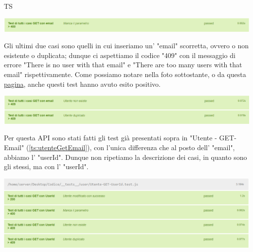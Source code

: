 \begin{listaPersonale}{TS}
                \begin{center}
                        \includegraphics[width=1\textwidth, height=0.04\textheight]{img/png/tests/UtenteGet_email/400_missingParameter_getUtente_email.png}
                \end{center}
                Gli ultimi due casi sono quelli in cui inseriamo un' "email" scorretta, ovvero o non esistente o duplicata; dunque ci aspettiamo il codice "409" con il messaggio di errore "There is no user with that email" e "There are too many users with that email" rispettivamente. Come possiamo notare nella foto sottostante, o da questa \href{https://plan-it.it/test-report.html} {pagina}, anche questi test hanno avuto esito positivo.
                \begin{center}
                        \includegraphics[width=1\textwidth, height=0.08\textheight]{img/png/tests/UtenteGet_email/409_userId_getUtente_email.png}
                \end{center}
                \newpage
                Per questa API sono stati fatti gli test già presentati sopra in "Utente - GET-Email" (\ref{ts:utenteGetEmail}), con l'unica differenza che al posto dell' "email", abbiamo l' "userId". Dunque non ripetiamo la descrizione dei casi, in quanto sono gli stessi, ma con l' "userId".
                \begin{center}
                        \includegraphics[width=1\textwidth, height=0.2\textheight]{img/png/tests/UtenteGet_userId/getUtente_userId.png}

\end{center}
\end{listaPersonale}
